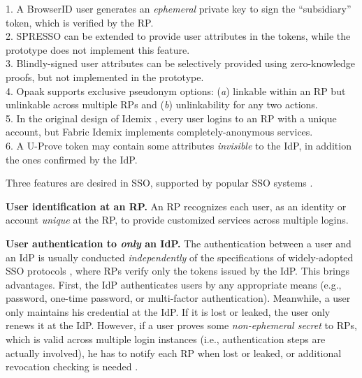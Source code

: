 \begin{table}[tb]
\flushleft
{\footnotesize
1. A BrowserID user generates an \emph{ephemeral} private key to sign the ``subsidiary'' token,
 which is verified by the RP.\\
2. SPRESSO can be extended to provide user attributes in the tokens, while the prototype does not implement this feature.\\
3. Blindly-signed user attributes can be selectively provided using zero-knowledge proofs,
    but not implemented in the prototype.\\
4. Opaak supports exclusive pseudonym options: (\emph{a}) linkable within an RP but unlinkable across multiple RPs and (\emph{b}) unlinkability for any two actions.\\
5. In the original design of Idemix \cite{idemix}, every user logins to an RP with a unique account, but Fabric Idemix implements completely-anonymous services.\\
6. A U-Prove token may contain some attributes \emph{invisible} to the IdP, in addition the ones confirmed by the IdP.}
\end{table}

Three features are desired in SSO, supported by popular SSO systems \cite{NIST2017draft,OpenIDConnect,rfc6749,SAML,SAMLIdentifier}.

\noindent \textbf{User identification at an RP.}
An RP recognizes each user, as an identity or account \emph{unique}  at the RP,
    to provide customized services across multiple logins.


\noindent\textbf{User authentication to {\em only} an IdP.}
The authentication between a user and an IdP is usually conducted \emph{independently}
    of the specifications of widely-adopted SSO protocols \cite{OpenIDConnect,rfc6749,SAML},
where RPs verify only the tokens issued by the IdP.
This brings advantages. First, the IdP authenticates users by any appropriate means (e.g., password,
one-time password, or multi-factor authentication).
Meanwhile, a user only maintains his credential at the IdP.
 If it is lost or leaked, the user only renews it at the IdP.
However, if a user proves some \emph{non-ephemeral secret} to RPs, which is valid across multiple login instances (i.e., authentication steps are actually involved),
 he has to notify each RP when lost or leaked, %
  or additional revocation checking is needed \cite{ELPASSO,UnlimitID}.

